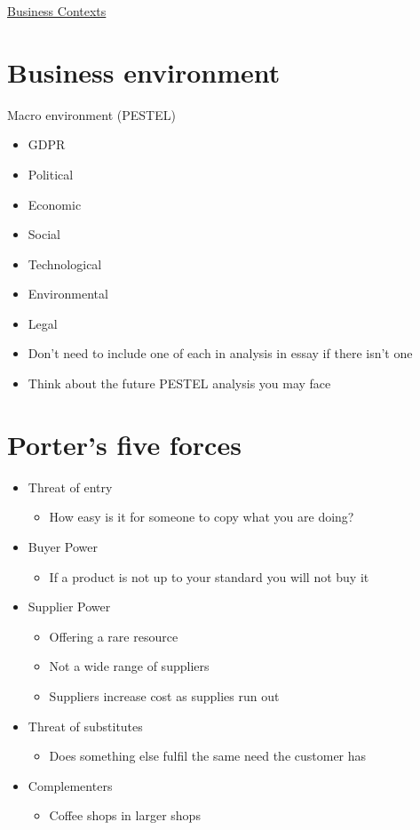 \documentclass{article}[18pt]
\begin{document}
\begin{center}
\underline{\huge Business Contexts}
\end{center}
\section{Business environment}
Macro environment (PESTEL)
\begin{itemize}
	\item GDPR 
	\item Political
	\item Economic
	\item Social
	\item Technological
	\item Environmental
	\item Legal
	\item Don't need to include one of each in analysis in essay if there isn't one
	\item Think about the future PESTEL analysis you may face
\end{itemize}
\section{Porter's five forces}
\begin{itemize}
	\item Threat of entry
	\begin{itemize}
		\item How easy is it for someone to copy what you are doing?
	\end{itemize}
	\item Buyer Power
	\begin{itemize}
		\item If a product is not up to your standard you will not buy it
	\end{itemize}
	\item Supplier Power
	\begin{itemize}
		\item Offering a rare resource
		\item Not a wide range of suppliers
		\item Suppliers increase cost as supplies run out
	\end{itemize}
	\item Threat of substitutes
	\begin{itemize}
		\item Does something else fulfil the same need the customer has
	\end{itemize}
	\item Complementers  
	\begin{itemize}
		\item Coffee shops in larger shops
	\end{itemize}
\end{itemize}
\end{document}
